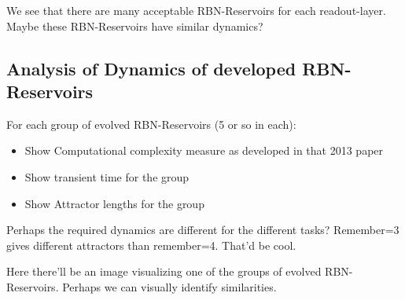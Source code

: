 We see that there are many acceptable RBN-Reservoirs for each readout-layer.
Maybe these RBN-Reservoirs have similar dynamics?


\subsection{Analysis of Dynamics of developed RBN-Reservoirs}

For each group of evolved RBN-Reservoirs (5 or so in each):

\begin{itemize}
  \item Show Computational complexity measure as developed in that 2013 paper
  \item Show transient time for the group
  \item Show Attractor lengths for the group
\end{itemize}


Perhaps the required dynamics are different for the different tasks?
Remember=3 gives different attractors than remember=4. That'd be cool.


Here there'll be an image visualizing one of the groups of evolved RBN-Reservoirs.
Perhaps we can visually identify similarities.
